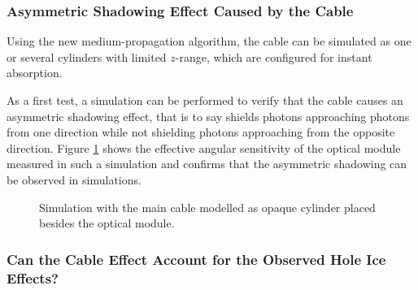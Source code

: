 \subsubsection{Asymmetric Shadowing Effect Caused by the Cable}

Using the new medium-propagation algorithm, the cable can be simulated as one or several cylinders with limited $z$-range, which are configured for instant absorption.

As a first test, a simulation can be performed to verify that the cable causes an asymmetric shadowing effect, that is to say shields photons approaching photons from one direction while not shielding photons approaching from the opposite direction. Figure \ref{fig:ochoCh7o} shows the effective angular sensitivity of the optical module measured in such a simulation and confirms that the asymmetric shadowing can be observed in simulations.


\begin{figure}[htbp]
  \hfill
  \caption{Simulation with the main cable modelled as opaque cylinder placed besides the optical module.}
  \label{fig:ochoCh7o}
\end{figure}

\subsubsection{Can the Cable Effect Account for the Observed Hole Ice Effects?}

